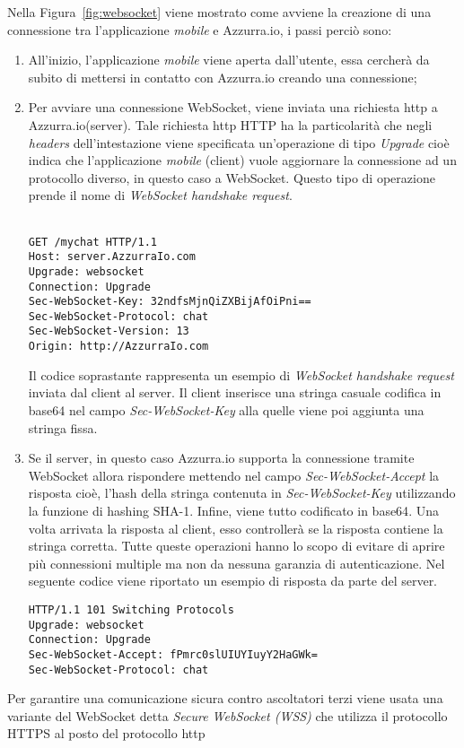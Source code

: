 Nella Figura~\ref{fig:websocket} viene mostrato come avviene la creazione di una connessione tra l'applicazione \emph{mobile} e Azzurra.io, i passi perciò sono:
\begin{enumerate}
	\item All'inizio, l'applicazione \emph{mobile} viene aperta dall'utente, essa cercherà da subito di mettersi in contatto con Azzurra.io creando una connessione;
	\item Per avviare una connessione \gls{WebSocket}\ap{[g]}, viene inviata una richiesta \gls{http}\ap{[g]} a Azzurra.io(\gls{server}\ap{[g]}). Tale richiesta \gls{http}\ap{[g]} HTTP ha la particolarità che negli \emph{headers} dell’intestazione viene specificata un'operazione di tipo \emph{Upgrade} cioè indica che l'applicazione \emph{mobile} (\gls{client}\ap{[g]}) vuole aggiornare la connessione ad un protocollo diverso, in questo caso a \gls{WebSocket}\ap{[g]}. Questo tipo di operazione prende il nome di \emph{WebSocket handshake request}.\\ \\
	\begin{lstlisting}
GET /mychat HTTP/1.1
Host: server.AzzurraIo.com
Upgrade: websocket	
Connection: Upgrade		
Sec-WebSocket-Key: 32ndfsMjnQiZXBijAfOiPni==
Sec-WebSocket-Protocol: chat		
Sec-WebSocket-Version: 13		
Origin: http://AzzurraIo.com
	\end{lstlisting}
	Il codice soprastante rappresenta un esempio di \emph{WebSocket handshake request} inviata dal \gls{client}\ap{[g]} al \gls{server}\ap{[g]}. Il \gls{client}\ap{[g]} inserisce una stringa casuale codifica in \gls{base64}\ap{[g]} nel campo \emph{Sec-WebSocket-Key} alla quelle viene poi aggiunta una stringa fissa.
	\item Se il \gls{server}\ap{[g]}, in questo caso Azzurra.io supporta la connessione tramite \gls{WebSocket}\ap{[g]} allora rispondere mettendo nel campo \emph{Sec-WebSocket-Accept} la risposta cioè, l'hash della stringa contenuta in \emph{Sec-WebSocket-Key} utilizzando la funzione di hashing SHA-1. Infine, viene tutto codificato in \gls{base64}\ap{[g]}. Una volta arrivata la risposta al \gls{client}\ap{[g]}, esso controllerà se la risposta contiene la stringa corretta. Tutte queste operazioni hanno lo scopo di evitare di aprire più connessioni multiple ma non da nessuna garanzia di autenticazione.
	Nel seguente codice viene riportato un esempio di risposta da parte del server.\\
	\begin{lstlisting}
HTTP/1.1 101 Switching Protocols
Upgrade: websocket
Connection: Upgrade
Sec-WebSocket-Accept: fPmrc0slUIUYIuyY2HaGWk=
Sec-WebSocket-Protocol: chat
	\end{lstlisting}
\end{enumerate}
Per garantire una comunicazione sicura contro ascoltatori terzi viene usata una variante del \gls{WebSocket}\ap{[g]} detta \emph{Secure WebSocket (WSS)} che utilizza il protocollo HTTPS al posto del protocollo \gls{http}\ap{[g]}
